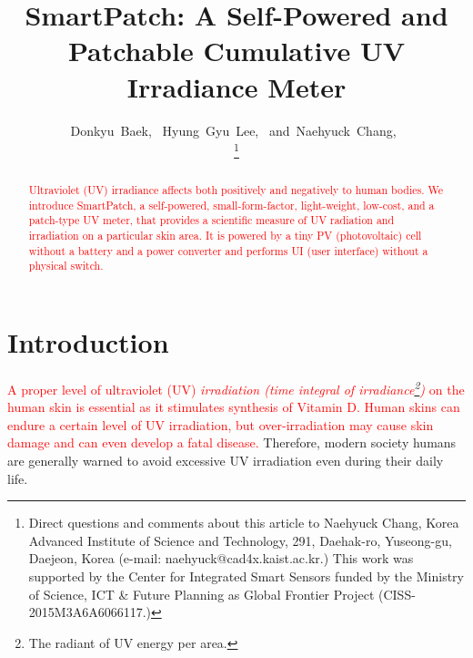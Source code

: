 \documentclass[journal]{IEEEtran}
\begin{document}
\title{SmartPatch: A Self-Powered and Patchable Cumulative UV Irradiance Meter}

\author{
	Donkyu~Baek,~
	Hyung~Gyu~Lee,~
	and~Naehyuck~Chang,~

\thanks{Direct questions and comments about this article to Naehyuck Chang, Korea Advanced Institute of Science and Technology, 291, Daehak-ro, Yuseong-gu, Daejeon, Korea (e-mail: naehyuck@cad4x.kaist.ac.kr.) This work was supported by the Center for Integrated Smart Sensors funded by the Ministry of Science, ICT \& Future Planning as Global Frontier Project (CISS-2015M3A6A6066117.)}
}

\maketitle

\begin{abstract}
\textcolor{red}{Ultraviolet (UV) irradiance affects both positively and negatively to human bodies. We introduce SmartPatch, a self-powered, small-form-factor, light-weight, low-cost, and a patch-type UV meter, that provides a scientific measure of UV radiation and irradiation on a particular skin area. It is powered by a tiny PV (photovoltaic) cell without a battery and a power converter and performs UI (user interface) without a physical switch.} 
\end{abstract}



\section{Introduction}

\textcolor{red}{A proper level of ultraviolet (UV) \textit{irradiation (time integral of irradiance\footnote{The radiant of UV energy per area.})} on the human skin is essential as it stimulates synthesis of Vitamin D. Human skins can endure a certain level of UV irradiation, but over-irradiation may cause skin damage and can even develop a fatal disease.}
Therefore, modern society humans are generally warned to avoid excessive UV irradiation even during their daily life.
\end{document}
